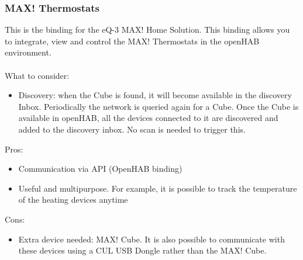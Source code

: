 \subsubsection{MAX! Thermostats}
This is the binding for the eQ-3 MAX! Home Solution. This binding allows you to integrate, view and control the MAX! Thermostats 
in the openHAB environment.\\~\\
What to consider:
\begin{itemize}
	\item Discovery: when the Cube is found, it will become available in the discovery Inbox. Periodically the network is queried again
	for a Cube. Once the Cube is available in openHAB, all the devices connected to it are discovered and added to the discovery inbox.
	No scan is needed to trigger this.
\end{itemize}
Pros:
\begin{itemize}
	\item Communication via API (OpenHAB binding)
	\item Useful and multipurpose. For example, it is possible to track the temperature of the heating devices anytime 
\end{itemize}
Cons:
\begin{itemize}
	\item Extra device needed: MAX! Cube. It is also possible to communicate with these devices using a CUL USB Dongle rather than
	the MAX! Cube.
\end{itemize}

